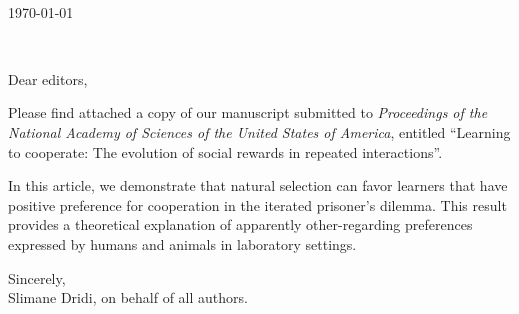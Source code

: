 \documentclass[11pt,letterpaper]{letter} %
\def\opening#1{\thispagestyle{empty}
{\centering\fromaddress \vspace{0.6in} \\ %
\hspace*{\longindentation}\today\hspace*{\fill}\par} %
{\raggedright \toname \\ \toaddress \par} %
\vspace{0.4in} %
\noindent #1 %
}
\begin{document}

\begin{letter}
{
}


\opening{Dear editors,}


Please find attached a copy of our manuscript submitted to \emph{Proceedings of the National Academy of Sciences of the United States of America}, entitled ``Learning to cooperate: The evolution of social rewards in repeated interactions''.


In this article, we demonstrate that natural selection can favor learners that have positive preference for cooperation in the iterated prisoner's dilemma. This result provides a theoretical explanation of apparently other-regarding preferences expressed by humans and animals in laboratory settings.



\closing{Sincerely,\\%
Slimane Dridi, on behalf of all authors.}




\end{letter}
\end{document}

